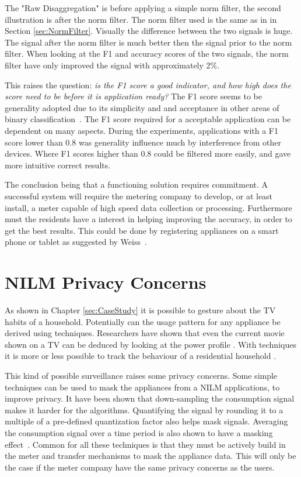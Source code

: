 The "Raw Disaggregation" is before applying a simple norm filter, the second illustration is after the norm filter. The norm filter used is the same as in in Section \ref{sec:NormFilter}. Visually the difference between the two signals is huge. The signal after the norm filter is much better then the signal prior to the norm filter. When looking at the F1 and accuracy scores of the two signals, the norm filter have only improved the signal with approximately 2\%.  

This raises the question: \textit{is the F1 score a good indicator, and how high does the score need to be before it is application ready?} The F1 score seems to be generality adopted due to its simplicity and and acceptance in other areas of binary classification~\citep{RefWorks:35}. The F1 score required for a acceptable application can be dependent on many aspects. During the experiments, applications with a F1 score lower than 0.8 was generality influence much by interference from other devices. Where F1 scores higher than 0.8 could be filtered more easily, and gave more intuitive correct results.  

The conclusion being that a functioning  solution requires commitment. A successful system will require the metering company to develop, or at least install, a meter capable of high speed data collection or processing. Furthermore must the residents have a interest in helping improving the accuracy, in order to get the best results. This could be done by registering appliances on a smart phone or tablet as suggested by Weiss~\citep{RefWorks:23}.

\section{NILM Privacy Concerns}
As shown in Chapter \ref{sec:CaseStudy} it is possible to gesture about the TV habits of a household. Potentially can the usage pattern for any appliance be derived using  techniques. Researchers have shown that even the current movie shown on a TV can be deduced by looking at the power profile \citep{RefWorks:39}. With  techniques it is more or less possible to track the behaviour of a residential household \citep{RefWorks:37}.

This kind of possible surveillance raises some privacy concerns. Some simple techniques can be used to mask the appliances from a NILM applications, to improve privacy. It have been shown that down-sampling the consumption signal makes it harder for the  algorithms. Quantifying the signal by rounding it to a multiple of a pre-defined quantization factor also helps mask signals. Averaging the consumption signal over a time period is also shown to have a masking effect~\citep{RefWorks:40}. Common for all these techniques is that they must be actively build in the meter and transfer mechanisms to mask the appliance data. This will only be the case if the meter company have the same privacy concerns as the users. 


